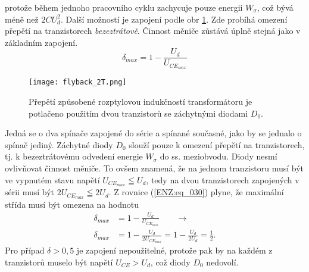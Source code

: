     protože během jednoho pracovního cyklu zachycuje pouze energii \(W_\sigma\), což bývá méně 
    než \(2CU_d^2\). Další možností je zapojení podle obr \ref{ENZ:fig_013}. Zde probíhá omezení 
    přepětí na tranzistorech \emph{bezeztrátově}. Činnost měniče zůstává úplně stejná jako v 
    základním zapojení.
    \begin{equation}
      \delta_{max} = 1-\frac{U_d}{U_{CE_{max}}}
    \end{equation}
    \begin{figure}[ht!]
      \centering
      \texttt{[image: flyback\_2T.png]}
      \caption{Přepětí způsobené rozptylovou indukčností transformátoru je potlačeno použitím 
               dvou tranzistorů se záchytnými diodami \(D_0\).}
      \label{ENZ:fig_013}
    \end{figure} 
    Jedná se o dva spínače zapojené do série a spínané současné, jako by se jednalo o spínač 
    jediný. Záchytné diody \(D_0\) slouží pouze k omezení přepětí na tranzistorech, tj. k 
    bezeztrátovému odvedení energie \(W_\sigma\) do ss. meziobvodu. Diody nesmí ovlivňovat 
    činnost měniče. To ovšem znamená, že na jednom tranzistoru musí být ve vypnutém stavu napětí 
    \(U_{CE_{max}}\leqq U_d\), tedy na dvou tranzistorech zapojených v sérii musí být 
    \(2U_{CE_{max}}\leqq 2U_d\). Z rovnice (\ref{ENZ:eq_030}) plyne, že maximální střída musí být 
    omezena na hodnotu
    \begin{align}\label{ENZ:eq_034}
      \delta_{max} &= 1-\frac{U_d}{U_{CE_{max}}} \qquad \rightarrow   \nonumber \\
      \delta_{max} &= 1-\frac{U_d}{2U_{CE_{max}}} = 1 - \frac{U_d}{2U_d} = \frac{1}{2}.
    \end{align}
    Pro případ \(\delta > 0,5\) je zapojení nepoužitelné, protože pak by na každém z tranzistorů 
    muselo být napětí \(U_{CE} > U_d\), což diody \(D_0\) nedovolí.  
